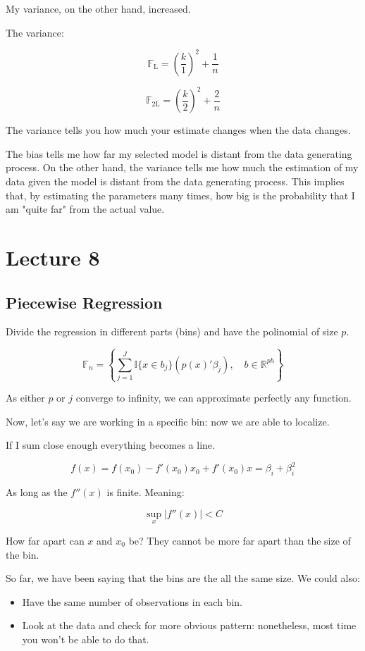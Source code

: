 \documentclass{article}
\begin{document}
My variance, on the other hand, increased.

The variance:

$$
\mathbb{F}_{\text{L}} = \left( \frac{k}{1} \right)^2 + \frac{1}{n}
$$

$$
\mathbb{F}_{\text{2L}} = \left( \frac{k}{2} \right)^2 + \frac{2}{n}
$$

The variance tells you how much your estimate changes when the data changes.

The bias tells me how far my selected model is distant from the data generating process. On the other hand, the variance tells me how much the estimation of my data given the model is distant from the data generating process. This implies that, by estimating the parameters many times, how big is the probability that I am "quite far" from the actual value.

\section{Lecture 8}
\subsection{Piecewise Regression}

Divide the regression in different parts (bins) and have the polinomial of size $p$.

$$
\mathbb{F}_n = \left\{ \sum_{j=1}^{J} \mathbb{I} \{ x \in b_j \} (p(x)' \beta_j), \quad b \in \mathbb{R}^{ph} \right\}
$$

As either $p$ or $j$ converge to infinity, we can approximate perfectly any function.

Now, let's say we are working in a specific bin: now we are able to localize.

If I sum close enough everything becomes a line.

$$
f(x) = f(x_0) - f'(x_0) x_0 + f'(x_0) x = \beta_i + \beta_i^2
$$

As long as the $f''(x)$ is finite. Meaning:

$$
\sup_x | f''(x) | < C
$$

How far apart can $x$ and $x_0$ be? They cannot be more far apart than the size of the bin.

So far, we have been saying that the bins are the all the same size. We could also:

\begin{itemize}
    \item Have the same number of observations in each bin.
    \item Look at the data and check for more obvious pattern: nonetheless, most time you won't be able to do that.
\end{itemize}
\end{document}
